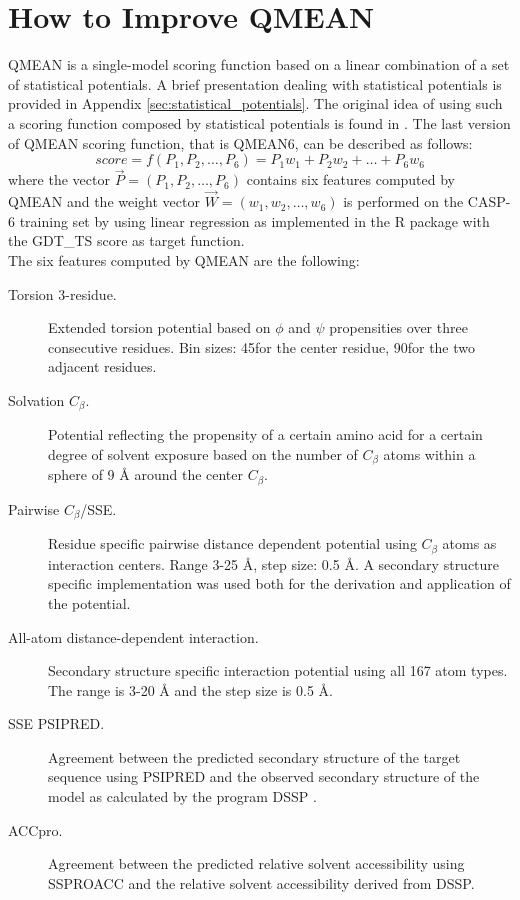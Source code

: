 \section{How to Improve QMEAN}
\label{sec:howto_improve_qmean}
QMEAN \cite{Benkert2007, Benkert2008ab, Benkert2008aa, Tosatto2002} is a single-model scoring function based on a linear combination of a set of statistical potentials. A brief presentation dealing with statistical potentials is provided in Appendix \ref{sec:statistical_potentials}. The original idea of using such a scoring function composed by statistical potentials is found in  \cite{Tosatto2005}. The last version of QMEAN scoring function, that is QMEAN6, can be described as follows:
\begin{equation}
	score = f(P_1, P_2, \ldots, P_6) = P_1w_1 + P_2w_2 + \ldots + P_6w_6
\end{equation}
where the vector \(\vec{P} = (P_1,P_2,\ldots,P_6)\) contains six features computed by QMEAN and the weight vector \(\vec{W} = (w_1,w_2,\ldots,w_6)\) is performed on the CASP-6 training set by using linear regression as implemented in the R package with the GDT\_TS score as target function.\\
The six features computed by QMEAN are the following:
\begin{description}
\item[Torsion 3-residue.] Extended torsion potential based on $\phi$ and $\psi$ propensities over three consecutive residues. Bin sizes: 45\textdegree\space for the center residue, 90\textdegree\space for the two adjacent residues.
\item[Solvation $C_\beta$.] Potential reflecting the propensity of a certain amino acid for a certain degree of solvent exposure based on the number of $C_\beta$ atoms within a sphere of 9 \AA{} around the center $C_\beta$.
\item[Pairwise $C_\beta$/SSE.] Residue specific pairwise distance dependent potential using $C_\beta$ atoms as interaction centers. Range 3-25 \AA{}, step size: 0.5 \AA{}. A secondary structure specific implementation was used both for the derivation and application of the potential.
\item[All-atom distance-dependent interaction.] Secondary structure specific interaction potential using all 167 atom types. The range is 3-20 \AA{} and the step size is 0.5 \AA{}.
\item[SSE PSIPRED.] Agreement between the predicted secondary structure of the target sequence using PSIPRED \cite{Jones1999aa} and the observed secondary structure of the model as calculated by the program \gls{DSSP} \cite{Kabsch1983aa}.
\item[ACCpro.] Agreement between the predicted relative solvent accessibility using SSPROACC \cite{Pollastri2007aa, Schuster1997aa} and the relative solvent accessibility derived from DSSP.
\end{description}

